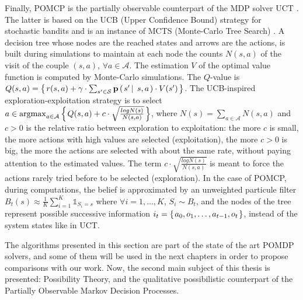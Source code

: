 Finally, POMCP \cite{NIPS2010_4031} is the partially observable counterpart 
of the MDP solver UCT \cite{Kocsis:2006:BBM:2091602.2091633}. 
The latter is based on the UCB (Upper Confidence Bound) strategy for stochastic bandits \cite{Auer:2002:FAM:599614.599677}
and is an instance of MCTS (Monte-Carlo Tree Search) \cite{2008}.
A decision tree whose nodes are the reached states and arrows are the actions, 
is built during simulations to maintain at each node
the counts $N(s,a)$ of the visit of the couple $(s,a)$, $\forall a \in \mathcal{A}$.
The estimation $V$ of the optimal value function
is computed by Monte-Carlo simulations.
The $Q$-value is $Q(s,a) = \left\{ \left.  r(s,a) + \gamma \cdot \sum_{s' \in \mathcal{S}} \textbf{p} \left( \left.  s' \, \right| \left. \, s,a  \right. \right) \cdot V(s')  \right. \right\}$.
The UCB-inspired exploration-exploitation strategy is to select 
$a \in \operatorname*{argmax}_{a \in \mathcal{A}} \left\{ \left.  Q(s,a)+ c \cdot \sqrt{ \frac{log N(s)}{N(s,a)} }  \right. \right\}$, 
where $N(s) = \sum_{a \in \mathcal{A}} N(s,a)$ 
and $c>0$ is the relative ratio between exploration to exploitation: 
the more $c$ is small, the more actions with high values are selected (exploitation),
the more $c>0$ is big, the more the actions are selected with about the same rate,
without paying attention to the estimated values. 
The term $c \cdot \sqrt{ \frac{log N(s)}{N(s,a)} }$ is meant to
force the actions rarely tried before to be selected (exploration).
In the case of POMCP, during computations, the belief is approximated 
by an unweighted particule filter $B_t(s) \approx \frac{1}{K} \sum_{i=1}^{K} \mathds{1}_{S_i = s}$
where $\forall i=1,\ldots,K$, $S_i \sim B_t$, 
and the nodes of the tree represent possible successive information 
$i_t = \left\{ \left. a_0,o_1,\ldots,a_{t-1},o_t \right. \right\}$, 
instead of the system states like in UCT.

The algorithms presented in this section 
are part of the state of the art POMDP solvers,
and some of them will be used in the next chapters
in order to propose comparisons with our work.
Now, the second main subject of this thesis
is presented: Possibility Theory, and the qualitative possibilistic counterpart
of the Partially Observable Markov Decision Processes.
